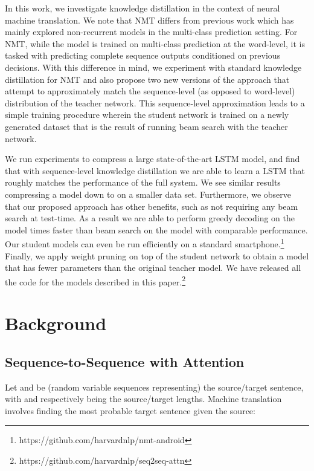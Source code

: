 \documentclass[11pt,letterpaper]{article}
\begin{document}
In this work, we investigate knowledge distillation  in the context of
neural machine translation. We note that NMT differs
from previous work which has mainly explored non-recurrent
models in the multi-class prediction setting. For NMT,
while the model is trained on multi-class prediction at the word-level, it is tasked
with predicting complete sequence outputs conditioned on previous
decisions. With this difference in mind, we experiment with standard knowledge
distillation for NMT and also propose two new versions of the approach
that attempt to approximately match the sequence-level (as opposed to word-level)
distribution of the teacher network. This
sequence-level approximation leads to a simple training procedure wherein the student
network is trained on a newly generated dataset that is the result of running beam search 
with the teacher network.

We run experiments to compress a large
state-of-the-art  LSTM model, and find that with sequence-level knowledge 
distillation we are
able to learn a  LSTM that roughly matches the performance
of the full system. We see similar results
compressing a  model down to  on a smaller
data set.  Furthermore, we observe that  our proposed approach has other
benefits, such as not requiring any beam search at test-time. As a
result we are able to perform greedy decoding on the 
model  times faster than beam search on the  model
with comparable performance. Our student models can even be run
efficiently on a standard smartphone.\footnote{https://github.com/harvardnlp/nmt-android}
Finally, we apply weight pruning on top of the student network to obtain a model that has 
 fewer parameters than the original teacher model.
 We have released all the code for the models 
described in this paper.\footnote{https://github.com/harvardnlp/seq2seq-attn}


\section{Background}

\subsection{Sequence-to-Sequence with Attention}\label{NMT}
Let  and  be 
 (random variable sequences representing) the source/target sentence, 
with  and  respectively being the source/target lengths. Machine translation
involves finding the most probable target sentence given the source: 
\end{document}
